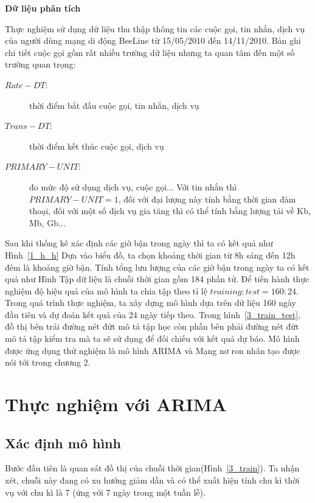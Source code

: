 \textbf{Dữ liệu phân tích}


Thực nghiệm sử dụng dữ liệu thu thập thông tin các cuộc gọi, tin nhắn, dịch vụ của người dùng mạng di động BeeLine từ 15/05/2010 đến 14/11/2010. Bản ghi chi tiết cuộc gọi gồm rất nhiều trường dữ liệu nhưng ta quan tâm đến một số trường quan trọng:
\begin{description}
\item[$Rate-DT$:] thời điểm bắt đầu cuộc gọi, tin nhắn, dịch vụ
\item[$Trans-DT$:] thời điểm kết thúc cuộc gọi, dịch vụ
\item[$PRIMARY-UNIT$:] đo mức độ sử dụng dịch vụ, cuộc gọi... Với tin nhắn thì $PRIMARY-UNIT=1$, đối với đại lượng này tính bằng thời gian đàm thoại, đối với một số dịch vụ gia tăng thì có thể tính bằng lượng tải về Kb, Mb, Gb...
\end{description}
Sau khi thống kê xác định các giờ bận trong ngày thì ta có kết quả như Hình~\ref{1_h_h}
Dựa vào biểu đồ, ta chọn khoảng thời gian từ 8h sáng đến 12h đêm là khoảng giờ bận. Tính tổng lưu lượng của các giờ bận trong ngày 
ta có kết quả như Hình
Tập dữ liệu là chuỗi thời gian gồm 184 phần tử. Để tiến hành thực nghiệm độ hiệu quả của mô hình ta chia tập theo tỉ lệ $training : test = 160 : 24$. Trong quá trình thực nghiệm, ta xây dựng mô hình dựa trên dữ liệu 160 ngày đầu tiên và dự đoán kết quả của 24 ngày tiếp theo. Trong hình~\ref{3_train_test}, đồ thị bên trái đường nét đứt mô tả tập học còn phần bên phải đường nét đứt mô tả tập kiểm tra mà ta sẽ sử dụng để đối chiếu với kết quả dự báo. Mô hình được ứng dụng thử nghiệm là mô hình ARIMA và Mạng nơ ron nhân tạo được nói tới trong chương 2.
\section{Thực nghiệm với ARIMA}
\subsection{Xác định mô hình}
Bước đầu tiên là quan sát đồ thị của chuỗi thời gian(Hình~\ref{3_train}). Ta nhận xét, chuỗi này đang có xu hướng giảm dần và có thể xuất hiện tính chu kì thời vụ với chu kì là $7$ (ứng với 7 ngày trong một tuần lễ).

